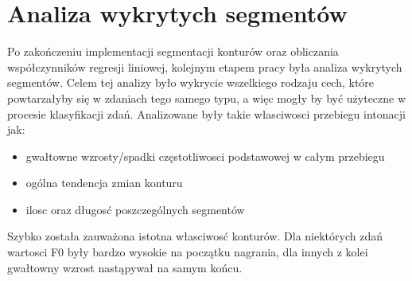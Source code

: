\documentclass[a4paper,12 pt]{report}
\begin{document}
\chapter{Analiza wykrytych segmentów}
Po zakończeniu implementacji segmentacji konturów oraz obliczania współczynników regresji liniowej, kolejnym etapem pracy była analiza wykrytych segmentów. Celem tej analizy było wykrycie wszelkiego rodzaju cech, które powtarzałyby się w zdaniach tego samego typu, a więc mogły by być użyteczne w procesie klasyfikacji zdań. 
Analizowane były takie własciwosci przebiegu intonacji jak:
\begin{itemize}
\item{gwałtowne wzrosty/spadki częstotliwosci podstawowej w całym przebiegu }
\item{ogólna tendencja zmian konturu}
\item{ilosc oraz długosć poszczególnych segmentów}
\end{itemize}

Szybko została zauważona istotna własciwosć konturów. Dla niektórych zdań wartosci F0 były bardzo wysokie na początku nagrania, dla innych z kolei gwałtowny wzrost nastąpywał na samym końcu.
\end{document}
